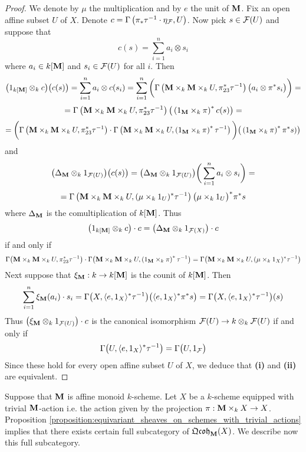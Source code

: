 \begin{proof}
We denote by $\mu$ the multiplication and by $e$ the unit of $\mathbf{M}$. Fix an open affine subset $U$ of $X$. Denote $c = \Gamma\left(\pi_*\tau^{-1}\cdot \eta_{{\mathcal F}}, U\right)$. Now pick $s\in {\mathcal F}(U)$ and suppose that
$$c(s) = \sum_{i=1}^na_i\otimes s_i$$
where $a_i \in k[\mathbf{M}]$ and $s_i \in {\mathcal F}(U)$ for all $i$. Then
$$\big(1_{k[\mathbf{M}]}\otimes_k c\big)\big(c(s)\big) = \sum_{i=1}^na_i\otimes c(s_i) =  \sum_{i=1}^n\bigg( \Gamma\left(\mathbf{M}\times_k \mathbf{M} \times_kU, \pi_{23}^*\tau^{-1}\right)\big(a_i \otimes \pi^*s_i\big) \bigg) =$$
$$= \Gamma\left(\mathbf{M}\times_k \mathbf{M} \times_kU, \pi_{23}^*\tau^{-1}\right)\big(\left(1_{\mathbf{M}}\times_k \pi\right)^*c(s)\big) =$$
$$= \bigg(\Gamma\left(\mathbf{M}\times_k \mathbf{M} \times_kU, \pi_{23}^*\tau^{-1}\right) \cdot \Gamma\left(\mathbf{M} \times_k \mathbf{M} \times_k U, \left(1_{\mathbf{M}}\times_k \pi\right)^*\tau^{-1}\right)\bigg) \big(\left(1_{\mathbf{M}}\times_k \pi\right)^*\pi^*s)\big)$$
and
$$\big(\Delta_{\mathbf{M}}\otimes_k 1_{{\mathcal F}(U)}\big)\big(c(s)\big) = \big(\Delta_{\mathbf{M}}\otimes_k 1_{{\mathcal F}(U)}\big)\bigg(\sum_{i=1}^na_i\otimes s_i\bigg) =$$
$$=\Gamma\left(\mathbf{M}\times_k\mathbf{M}\times_kU, (\mu\times_k 1_U)^*\tau^{-1}\right)\big(\mu\times_k 1_U\big)^*\pi^*s$$
where $\Delta_{\mathbf{M}}$ is the comultiplication of $k[\mathbf{M}]$. Thus
$$\big(1_{k[\mathbf{M}]}\otimes_k c\big)\cdot c = \big(\Delta_{\mathbf{M}}\otimes_k 1_{{\mathcal F}(X)}\big)\cdot c$$
if and only if 
$$\Gamma\big(\mathbf{M}\times_k\mathbf{M}\times_kU,\pi_{23}^*\tau^{-1}\big) \cdot \Gamma\big(\mathbf{M}\times_k\mathbf{M}\times_kU,\left(1_{\mathbf{M}}\times_k \pi\right)^*\tau^{-1}\big) = \Gamma\big(\mathbf{M}\times_k\mathbf{M}\times_kU,(\mu\times_k 1_X)^*\tau^{-1}\big)$$
Next suppose that $\xi_{\mathbf{M}}:k\rightarrow k[\mathbf{M}]$ is the counit of $k[\mathbf{M}]$. Then
$$\sum_{i=1}^n \xi_{\mathbf{M}}(a_i) \cdot s_i = \Gamma\big(X, \langle e,1_X \rangle^*\tau^{-1}\big)\big(\langle e ,1_X\rangle^*\pi^*s\big) = \Gamma\big(X, \langle e,1_X \rangle^*\tau^{-1}\big)(s)$$
Thus $\big(\xi_{\mathbf{M}} \otimes_k 1_{{\mathcal F}(U)}\big)\cdot c$ is the canonical isomorphism ${\mathcal F}(U)\rightarrow k\otimes_k{\mathcal F}(U)$ if and only if 
$$\Gamma\big(U, \langle e, 1_X\rangle^*\tau^{-1}\big) = \Gamma\big(U,1_{{\mathcal F}}\big)$$
Since these hold for every open affine subset $U$ of $X$, we deduce that \textbf{(i)} and \textbf{(ii)} are equivalent.
\end{proof}

\begin{remark}\label{remark:qc_sheaves_with_coaction}
Suppose that $\mathbf{M}$ is affine monoid $k$-scheme. Let $X$ be a $k$-scheme equipped with trivial $\mathbf{M}$-action i.e. the action given by the projection $\pi:\mathbf{M}\times_kX\rightarrow X$. Proposition \ref{proposition:equivariant_sheaves_on_schemes_with_trivial_actions} implies that there exists certain full subcategory of $\mathfrak{Qcoh}_{\mathbf{M}}(X)$. We describe now this full subcategory.
\end{remark}





\small




